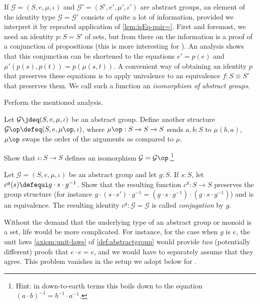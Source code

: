 \begin{remark}
  If $\mathcal G=(S,e,\mu,\iota)$ and $\mathcal G'=(S',e',\mu',\iota')$ are abstract groups, an element of the identity type $\mathcal
  G=\mathcal G'$ consists of quite a lot of information, provided we interpret it by repeated application of \cref{lem:isEq-pair=}.  First and
  foremost, we need an identity $p:S=S'$ of sets, but from there on the information is a proof of a conjunction of propositions (this is more
  interesting for \inftygps).  An analysis shows that this conjunction can be shortened to the equations $e'=p(e)$ and
  $\mu'(p(s),p(t))=p(\mu(s,t))$.  A convenient way of obtaining an identity $p$ that preserves these equations is to apply univalence to an
  equivalence $f: S \equiv S'$ that preserves them.
  We call such a function an \emph{isomorphism of abstract groups}.
\end{remark}

\begin{xca}
  Perform the mentioned analysis.
\end{xca}

\begin{xca}
  \label{xca:op-abs-group}
  Let $\mathcal G \jdeq (S,e,\mu,\iota)$ be an abstract group.
  Define another structure $\mathcal G\op \defeq (S,e,\mu\op,\iota)$,
  where $\mu\op : S \to S \to S$ sends $a,b:S$ to $\mu(b,a)$,
  \ie $\mu\op$ swaps the order of the arguments as compared to $\mu$.

  Show that $\iota : S \to S$ defines an isomorphism $\mathcal G = \mathcal G\op$.\footnote{Hint: in down-to-earth terms this boils down to the equation
    $(a\cdot b)^{-1} = b^{-1}\cdot a^{-1}$.}
\end{xca}

\begin{xca}
  \label{xca:conj}
  Let $\mathcal G=(S,e,\mu,\iota)$ be an abstract group and let $g:S$.  If $s:S$, let $c^g(s)\defequi g\cdot s\cdot g^{-1}$.  Show that the resulting function $c^g:S\to S$ preserves the group structure (for instance $g\cdot(s\cdot s')\cdot g^{-1}=(g\cdot s\cdot g^{-1} )\cdot(g\cdot s\cdot g^{-1})$) and is an equivalence.  The resulting identity $c^g:\mathcal G=\mathcal G$ is called \emph{conjugation} by $g$.
\end{xca}

  \begin{remark}
    Without the demand that the underlying type of an abstract group or monoid is a set, life would be more complicated.  For instance, for the
    case when $g$ is $e$, the unit laws \ref{axiom:unit-laws} of \cref{def:abstractgroup} would provide \emph{two} (potentially different)
    proofs that $e\cdot e = e$, and we would have to separately assume that they agree.  This problem vanishes in the setup we adopt below for
    \inftygps.
  \end{remark}

